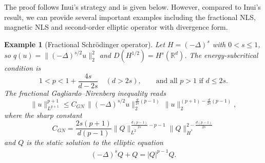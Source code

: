 \documentclass[10pt%
]{amsart}
\numberwithin{equation}{section}
\newtheorem{example}{Example}[section]
\theoremstyle{definition}
\newtheorem{remark}[theorem]{Remark}
\begin{document}

	The proof follows Inui's strategy and is given below. However, compared to Inui's result,  we can provide several important examples including the fractional NLS, magnetic NLS and second-order elliptic operator with divergence form. 
	\begin{example}[Fractional Schr\"odinger operator]
		Let $H=(-\Delta)^s$ with $0<s\le 1$, so $q(u)=\|(-\Delta)^{s/2}u\|_2^2$ and $D(H^{1/2})=H^s(\mathbb R^d)$.
		The energy-subcritical condition is
		\[
		1<p<1+\frac{4s}{d-2s}\quad (d>2s),
		\qquad \text{and all }p>1\text{ if }d\le 2s.
		\]
		The fractional Gagliardo--Nirenberg inequality reads
		\[
		\|u\|_{L^{p+1}}^{p+1}
		\le
		C_{GN}\,\|(-\Delta)^{s/2}u\|_{2}^{\frac{d}{2s}(p-1)}\,\|u\|_2^{(p+1)-\frac{d}{2s}(p-1)},
		\]
		where the sharp constant $$C_{GN}=\frac{2s(p+1)}{d(p-1)}\|Q\|_{L^2}^{\frac{d(p-1)}{2s}-p-1}\|Q\|_{\dot H^s}^{2-\frac{d(p-1)}{2s}}$$
		and $Q$ is the static solution to the elliptic equation
		\begin{align*}
			(-\Delta)^sQ+Q=|Q|^{p-1}Q.
		\end{align*}
		
	\end{example}
	
\end{document}
